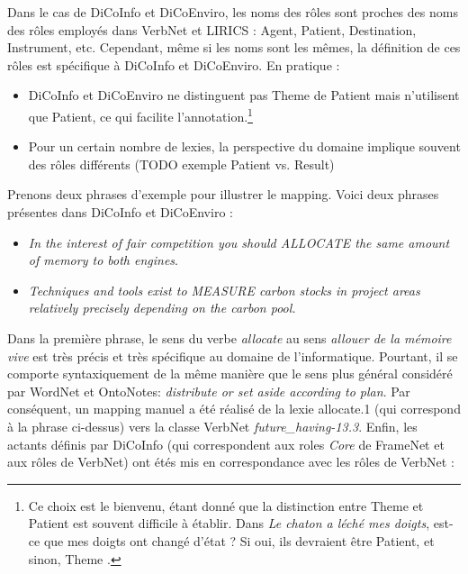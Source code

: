 Dans le cas de DiCoInfo et DiCoEnviro, les noms des rôles sont proches des noms
des rôles employés dans VerbNet et LIRICS \citep{bonial2011hierarchical} :
Agent, Patient, Destination, Instrument, etc. Cependant, même si les noms sont
les mêmes, la définition de ces rôles est spécifique à DiCoInfo et DiCoEnviro.
En pratique :

\begin{itemize}

    \item DiCoInfo et DiCoEnviro ne distinguent pas Theme de Patient mais
n'utilisent que Patient, ce qui facilite l'annotation.\footnote{Ce choix est le
bienvenu, étant donné que la distinction entre Theme et Patient est souvent
difficile à établir. Dans \textit{Le chaton a léché mes doigts}, est-ce que mes
doigts ont changé d'état ? Si oui, ils devraient être Patient, et sinon, Theme
\citep[p.~5]{palmer2010semantic}.}

    \item Pour un certain nombre de lexies, la perspective du domaine implique
souvent des rôles différents (TODO exemple Patient vs. Result)

\end{itemize}

Prenons deux phrases d'exemple pour illustrer le mapping. Voici deux phrases
présentes dans DiCoInfo et DiCoEnviro :

\begin{itemize}
    \item \textit{In the interest of fair competition you should ALLOCATE the
        same amount of memory to both engines}.
    \item \textit{Techniques and tools exist to MEASURE carbon stocks in project areas
        relatively precisely depending on the carbon pool.}
\end{itemize}

Dans la première phrase, le sens du verbe \textit{allocate} au sens
\textit{allouer de la mémoire vive} est très précis et très spécifique au domaine
de l'informatique. Pourtant, il se comporte syntaxiquement de la même manière
que le sens plus général considéré par WordNet et OntoNotes: \textit{distribute
or set aside according to plan}. Par conséquent, un mapping manuel a été
réalisé de la lexie allocate.1 (qui correspond à la phrase ci-dessus) vers la
classe VerbNet \textit{future\_having-13.3}. Enfin, les actants définis par
DiCoInfo (qui correspondent aux roles \textit{Core} de FrameNet et aux rôles de
VerbNet) ont étés mis en correspondance avec les rôles de VerbNet :

